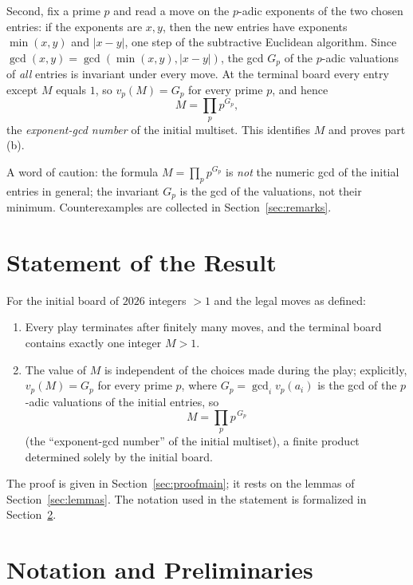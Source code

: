 \documentclass{article}
\begin{document}
Second, fix a prime $p$ and read a move on the $p$-adic exponents of the two
chosen entries: if the exponents are $x,y$, then the new entries have exponents
$\min(x,y)$ and $|x-y|$, one step of the subtractive Euclidean algorithm. Since
$\gcd(x,y)=\gcd(\min(x,y),|x-y|)$, the gcd $G_p$ of the $p$-adic valuations of
\emph{all} entries is invariant under every move. At the terminal board every
entry except $M$ equals $1$, so $v_p(M)=G_p$ for every prime $p$, and hence
\[
M=\prod_p p^{G_p},
\]
the \emph{exponent-gcd number} of the initial multiset. This identifies $M$ and
proves part (b).

A word of caution: the formula $M=\prod_p p^{G_p}$ is \emph{not} the numeric
gcd of the initial entries in general; the invariant $G_p$ is the gcd of the
valuations, not their minimum. Counterexamples are collected in
Section~\ref{sec:remarks}.

\section{Statement of the Result}

\begin{theorem}\label{thm:main}
For the initial board of $2026$ integers ${}>1$ and the legal moves as defined:
\begin{enumerate}
\item[(a)] Every play terminates after finitely many moves, and the terminal
           board contains exactly one integer $M>1$.
\item[(b)] The value of $M$ is independent of the choices made during the play;
           explicitly, $v_p(M)=G_p$ for every prime $p$, where
           $G_p=\gcd_i v_p(a_i)$ is the gcd of the $p$-adic valuations of the
           initial entries, so
           \[
           M=\prod_{p} p^{\,G_p}
           \]
           (the ``exponent-gcd number'' of the initial multiset), a finite
           product determined solely by the initial board.
\end{enumerate}
\end{theorem}

The proof is given in Section~\ref{sec:proofmain}; it rests on the lemmas of
Section~\ref{sec:lemmas}. The notation used in the statement is formalized in
Section~\ref{sec:nota}.

\section{Notation and Preliminaries}\label{sec:nota}
\end{document}
